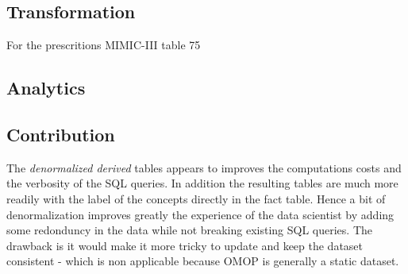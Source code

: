 \subsection{Transformation}
  For the prescritions MIMIC-III table 75%

\subsection{Analytics}

\subsection{Contribution}

The \emph{denormalized derived} tables appears to improves the computations
costs and the verbosity of the SQL queries. In addition the resulting tables
are much more readily with the label of the concepts directly in the fact
table. Hence a bit of denormalization improves greatly the experience of the
data scientist by adding some redonduncy in the data while not breaking
existing SQL queries. The drawback is it would make it more tricky to update
and keep the dataset consistent - which is non applicable because OMOP is
generally a static dataset.


